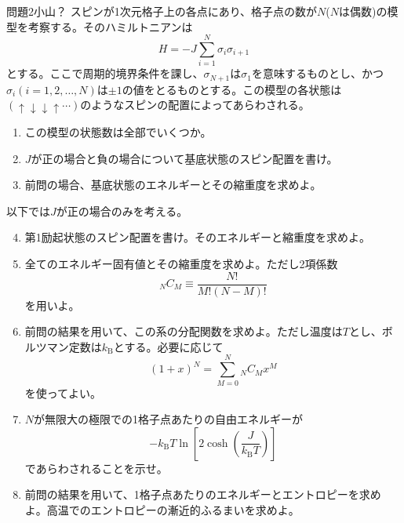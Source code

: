 \documentclass[fleqn]{jbook}
\begin{document}
\begin{question}{問題2}{小山？}
スピンが1次元格子上の各点にあり、格子点の数が$N$($N$は偶数)の模型を考察する。そのハミルトニアンは
\[
H=-J\sum _{i=1}^{N}\sigma_{i}\sigma_{i+1}
\]
とする。ここで周期的境界条件を課し、$\sigma_{N+1}$は$\sigma_{1}$を意味するものとし、かつ$\sigma_{i}(i=1,2,\ldots ,N)$は$\pm 1$の値をとるものとする。この模型の各状態は$(\uparrow \downarrow \downarrow \uparrow\cdots )$のようなスピンの配置によってあらわされる。
\begin{enumerate}
\item この模型の状態数は全部でいくつか。
\item $J$が正の場合と負の場合について基底状態のスピン配置を書け。
\item 前問の場合、基底状態のエネルギーとその縮重度を求めよ。\\
\end{enumerate}


以下では$J$が正の場合のみを考える。
\begin{enumerate}
\setcounter{enumi}{3}
\item 第1励起状態のスピン配置を書け。そのエネルギーと縮重度を求めよ。
\item 全てのエネルギー固有値とその縮重度を求めよ。ただし2項係数
\[
{}_{N}C_{M}\equiv \frac{N!}{M!(N-M)!}
\]
を用いよ。
\item 前問の結果を用いて、この系の分配関数を求めよ。ただし温度は$T$とし、ボルツマン定数は$k_{\mathrm{B}}$とする。必要に応じて
\[
(1+x)^{N}=\sum _{M=0}^{N}{}_{N}C_{M}x^{M}
\]
を使ってよい。
\item $N$が無限大の極限での1格子点あたりの自由エネルギーが
\[
-k_{\mathrm{B}}T\ln\left[2\cosh(\frac{J}{k_{\mathrm{B}}T})\right]
\]
であらわされることを示せ。
\item 前問の結果を用いて、1格子点あたりのエネルギーとエントロピーを求めよ。高温でのエントロピーの漸近的ふるまいを求めよ。
\end{enumerate}
\end{question}
\end{document}
